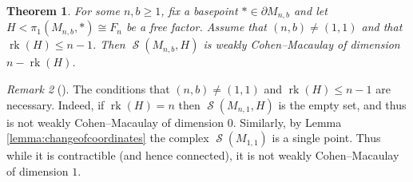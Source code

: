 \documentclass[11pt]{amsart}
\numberwithin{equation}{section}
\theoremstyle{plain}
\newtheorem{theorem}{Theorem}[section]
\theoremstyle{definition}
\theoremstyle{remark}
\newtheorem{rmk}[theorem]{Remark}
\newenvironment{remark}[1][]{\begin{rmk}[#1] \pushQED{\qed}}{\popQED \end{rmk}}
\DeclareMathOperator{\rank}{rk}
\DeclareMathOperator{\Spheres}{\mathcal{S}}
\begin{document}
\begin{theorem}
\label{theorem:spherescm}
For some $n,b \geq 1$, fix a basepoint $\ast \in \partial M_{n,b}$
and let $H < \pi_1(M_{n,b},\ast) \cong F_n$ be a free factor.  Assume that $(n,b) \neq (1,1)$ and
that $\rank(H) \leq n-1$.  Then $\Spheres(M_{n,b},H)$ is weakly Cohen--Macaulay of dimension
$n-\rank(H)$.
\end{theorem}

\begin{remark}
\label{remark:spherescmboundary}
The conditions that $(n,b) \neq (1,1)$ and $\rank(H) \leq n-1$ are necessary.  Indeed, if $\rank(H) = n$ then
$\Spheres(M_{n,1},H)$ is the empty set, and thus is not weakly Cohen--Macaulay of dimension $0$.  Similarly,
by Lemma \ref{lemma:changeofcoordinates} the
complex $\Spheres(M_{1,1})$ is a single point.  Thus while it is contractible (and hence connected), it
is not weakly Cohen--Macaulay of dimension $1$.
\end{remark} 
\end{document}
